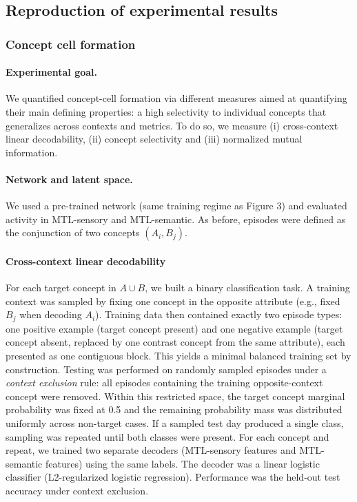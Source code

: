 \documentclass{article}
\begin{document}
\subsection*{Reproduction of experimental results}
\subsubsection*{Concept cell formation }
\paragraph{Experimental goal.}
We quantified concept-cell formation via different measures aimed at quantifying their main defining properties: a high selectivity to individual concepts that generalizes across contexts and metrics. To do so, we measure (i) cross-context linear decodability, (ii) concept selectivity and (iii) normalized mutual information.

\paragraph{Network and latent space.}
We used a pre-trained network (same training regime as Figure 3) and evaluated activity in MTL-sensory and MTL-semantic. As before, episodes were defined as the conjunction of two concepts $(A_i, B_j)$.

\paragraph{Cross-context linear decodability}
For each target concept in $A \cup B$, we built a binary classification task. A training context was sampled by fixing one concept in the opposite attribute (e.g., fixed $B_j$ when decoding $A_i$). Training data then contained exactly two episode types: one positive example (target concept present) and one negative example (target concept absent, replaced by one contrast concept from the same attribute), each presented as one contiguous block. This yields a minimal balanced training set by construction. 
\newline\newline
Testing was performed on randomly sampled episodes under a \emph{context exclusion} rule: all episodes containing the training opposite-context concept were removed. Within this restricted space, the target concept marginal probability was fixed at 0.5 and the remaining probability mass was distributed uniformly across non-target cases. If a sampled test day produced a single class, sampling was repeated until both classes were present.
\newline\newline
For each concept and repeat, we trained two separate decoders (MTL-sensory features and MTL-semantic features) using the same labels. The decoder was a linear logistic classifier (L2-regularized logistic regression). Performance was the held-out test accuracy under context exclusion.
\end{document}
